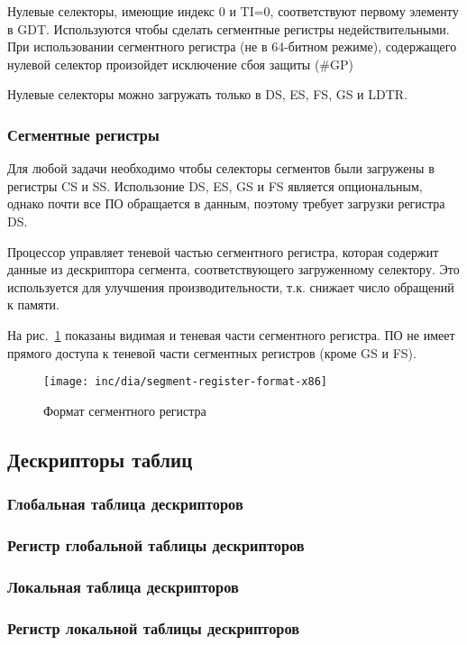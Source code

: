 Нулевые селекторы, имеющие индекс 0 и TI=0, соответствуют первому элементу в GDT. Используются
чтобы сделать сегментные регистры недействительными. При использовании сегментного регистра (не в 64-битном режиме),
содержащего нулевой селектор произойдет исключение сбоя защиты (\#GP)

Нулевые селекторы можно загружать только в DS, ES, FS, GS и LDTR.

\subsubsection*{Сегментные регистры}
Для любой задачи необходимо чтобы селекторы сегментов были загружены в регистры CS и SS.
Использоние DS, ES, GS и FS является опциональным, однако почти все ПО обращается в данным,
поэтому требует загрузки регистра DS.

Процессор управляет теневой частью сегментного регистра, которая содержит данные из дескриптора
сегмента, соответствующего загруженному селектору. Это используется для улучшения производительности,
т.к. снижает число обращений к памяти.

На рис.~\ref{fig:segment-register-format-x86} показаны видимая и теневая части сегментного регистра.
ПО не имеет прямого доступа к теневой части сегментных регистров (кроме GS и FS).

\begin{figure}
  \centering
  \texttt{[image: inc/dia/segment-register-format-x86]}
  \caption{Формат сегментного регистра}
  \label{fig:segment-register-format-x86}
\end{figure}

\subsection{Дескрипторы таблиц}
\subsubsection*{Глобальная таблица дескрипторов}
\subsubsection*{Регистр глобальной таблицы дескрипторов}
\subsubsection*{Локальная таблица дескрипторов}
\subsubsection*{Регистр локальной таблицы дескрипторов}
